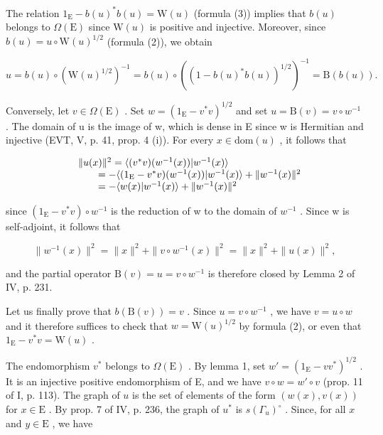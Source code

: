 The relation \(1_{\mathrm{E}} - b(u)^{*}b(u) = \mathrm{W}(u)\) (formula (3)) implies that \(b(u)\) belongs to \(\Omega (\mathrm{E})\) since \(\mathrm{W}(u)\) is positive and injective. Moreover, since \(b(u) = u\circ \mathrm{W}(u)^{1 / 2}\) (formula (2)), we obtain

\[
u = b (u) \circ (\mathrm{W} (u) ^ {1 / 2}) ^ {- 1} = b (u) \circ ((1 - b (u) ^ {*} b (u)) ^ {1 / 2}) ^ {- 1} = \mathrm{B} (b (u)).
\]

Conversely, let \(v \in \Omega(\mathrm{E})\) . Set \(w = (1_{\mathrm{E}} - v^{*}v)^{1/2}\) and set \(u = \mathrm{B}(v) = v \circ w^{-1}\) . The domain of u is the image of w, which is dense in E since w is Hermitian and injective (EVT, V, p. 41, prop. 4 (i)). For every \(x \in \mathrm{dom}(u)\) , it follows that

\[
\begin{array}{r l} & {\| u (x) \| ^ {2} = \langle (v ^ {*} v) (w ^ {- 1} (x)) | w ^ {- 1} (x) \rangle} \\ & {\qquad = - \langle (1 _ {\mathrm{E}} - v ^ {*} v) (w ^ {- 1} (x)) | w ^ {- 1} (x) \rangle + \| w ^ {- 1} (x) \| ^ {2}} \\ & {\qquad = - \langle w (x) | w ^ {- 1} (x) \rangle + \| w ^ {- 1} (x) \| ^ {2}} \end{array}
\]

since \((1_{\mathrm{E}} - v^{*}v) \circ w^{-1}\) is the reduction of w to the domain of \(w^{-1}\) . Since w is self-adjoint, it follows that

\[
\| w ^ {- 1} (x) \| ^ {2} = \| x \| ^ {2} + \| v \circ w ^ {- 1} (x) \| ^ {2} = \| x \| ^ {2} + \| u (x) \| ^ {2},
\]

and the partial operator \(\mathrm{B}(v) = u = v \circ w^{-1}\) is therefore closed by Lemma 2 of IV, p. 231.

Let us finally prove that \(b(\mathrm{B}(v)) = v\) . Since \(u = v \circ w^{-1}\) , we have \(v = u \circ w\) and it therefore suffices to check that \(w = \mathrm{W}(u)^{1/2}\) by formula (2), or even that \(1_{\mathrm{E}} - v^{*}v = \mathrm{W}(u)\) .

The endomorphism \(v^*\) belongs to \(\Omega(\mathrm{E})\) . By lemma 1, set \(w' = (1_{\mathrm{E}} - vv^{*})^{1/2}\) . It is an injective positive endomorphism of E, and we have \(v \circ w = w' \circ v\) (prop. 11 of I, p. 113). The graph of \(u\) is the set of elements of the form \((w(x), v(x))\) for \(x \in \mathrm{E}\) . By prop. 7 of IV, p. 236, the graph of \(u^*\) is \(s(\Gamma_u)^{\circ}\) . Since, for all \(x\) and \(y \in \mathrm{E}\) , we have


